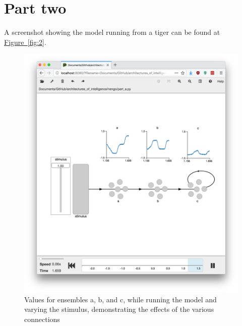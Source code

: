 \documentclass[12pt, a4paper, titlepage]{article}
\begin{document}
\section{Part two} %
\label{sec:part_two}
A screenshot showing the model running from a tiger can be found at \hyperref[fig:2]{Figure~\ref{fig:2}}.
\begin{figure}[p]
	\includegraphics[width=\textwidth]{screenshot_part_1_a.png}
	\caption{Values for ensembles a, b, and c, while running the model and varying the stimulus, demonstrating the effects of the various connections}
	\label{fig:1a}
\end{figure}
\end{document}
